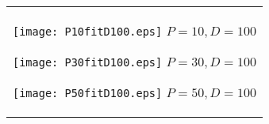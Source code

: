 \documentclass[a4paper,11pt,oneside,openany]{jsbook}
\begin{document}
\begin{figure}[htbp]
  \begin{center}
    \begin{tabular}{c}

      \begin{minipage}{0.33\hsize}
        \begin{center}
          \texttt{[image: P10fitD100.eps]}
          \hspace{1.2cm} $P=10, D=100$
        \end{center}
      \end{minipage}

      \begin{minipage}{0.33\hsize}
        \begin{center}
          \texttt{[image: P30fitD100.eps]}
          \hspace{1.2cm} $P=30, D=100$
        \end{center}
      \end{minipage}

      \begin{minipage}{0.33\hsize}
        \begin{center}
          \texttt{[image: P50fitD100.eps]}
          \hspace{1.2cm} $P=50, D=100$
        \end{center}
      \end{minipage}
    \end{tabular}
    \label{fig:lena}
  \end{center}
\end{figure}
\end{document}
